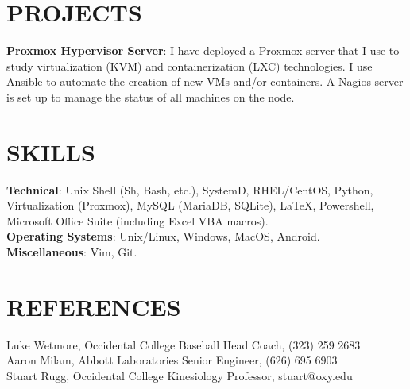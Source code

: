 \documentclass[margin]{res}
\begin{document}
\begin{resume}
\section{PROJECTS}
\par
\textbf{Proxmox Hypervisor Server}:
I have deployed a Proxmox server that I use to study virtualization (KVM) and containerization (LXC) technologies. I use Ansible to automate the creation of new VMs and/or containers. A Nagios server is set up to manage the status of all machines on the node.

\section{SKILLS}

\textbf{Technical}: Unix Shell (Sh, Bash, etc.), SystemD, RHEL/CentOS, Python, Virtualization (Proxmox), MySQL (MariaDB, SQLite), \LaTeX, Powershell, Microsoft Office Suite (including Excel VBA macros).
\\
\textbf{Operating Systems}: Unix/Linux, Windows, MacOS, Android.
\\
\textbf{Miscellaneous}: Vim, Git.

\section{REFERENCES}
Luke Wetmore, Occidental College Baseball Head Coach, (323) 259 2683 \\
Aaron Milam, Abbott Laboratories Senior Engineer, (626) 695 6903 \\
Stuart Rugg, Occidental College Kinesiology Professor, stuart@oxy.edu
\end{resume}
\end{document}
